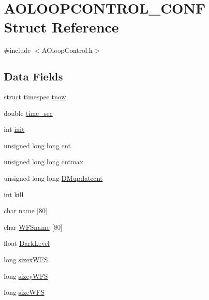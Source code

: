 \hypertarget{structAOLOOPCONTROL__CONF}{\section{A\+O\+L\+O\+O\+P\+C\+O\+N\+T\+R\+O\+L\+\_\+\+C\+O\+N\+F Struct Reference}
\label{structAOLOOPCONTROL__CONF}
}


{\ttfamily \#include $<$A\+Oloop\+Control.\+h$>$}

\subsection*{Data Fields}
\begin{DoxyCompactItemize}
\item 
struct timespec \hyperlink{structAOLOOPCONTROL__CONF_ab093c95577638273f80418cc0b881fca}{tnow}
\item 
double \hyperlink{structAOLOOPCONTROL__CONF_a677fd2a674cdf2db20608625c029e36f}{time\+\_\+sec}
\item 
int \hyperlink{structAOLOOPCONTROL__CONF_ad6958f819e3adfe11148f76411258372}{init}
\item 
unsigned long long \hyperlink{structAOLOOPCONTROL__CONF_a13b97bae290c8cd520b5015ba8dab75b}{cnt}
\item 
unsigned long long \hyperlink{structAOLOOPCONTROL__CONF_ad4cb2885deacdf16276144a9384e86fa}{cntmax}
\item 
unsigned long long \hyperlink{structAOLOOPCONTROL__CONF_a2f0776bf6fa997f833865d25ef5b1b93}{D\+Mupdatecnt}
\item 
int \hyperlink{structAOLOOPCONTROL__CONF_a7f98fb767a675407842dd6dc5b118a24}{kill}
\item 
char \hyperlink{structAOLOOPCONTROL__CONF_a89011839e5092011c81356159f76b9ac}{name} \mbox{[}80\mbox{]}
\item 
char \hyperlink{structAOLOOPCONTROL__CONF_a18a75018d87159819342add7bf9e79fb}{W\+F\+Sname} \mbox{[}80\mbox{]}
\item 
float \hyperlink{structAOLOOPCONTROL__CONF_ab68c979746a1ac6e411a367121fc3633}{Dark\+Level}
\item 
long \hyperlink{structAOLOOPCONTROL__CONF_a3c5249e7337b0733c4d4dc823d3e5bac}{sizex\+W\+F\+S}
\item 
long \hyperlink{structAOLOOPCONTROL__CONF_acadceda8680005ab95d7f32cd6dfe215}{sizey\+W\+F\+S}
\item 
long \hyperlink{structAOLOOPCONTROL__CONF_a5356d94cbd92bbbd016c7414fab01991}{size\+W\+F\+S}

\end{DoxyCompactItemize}
